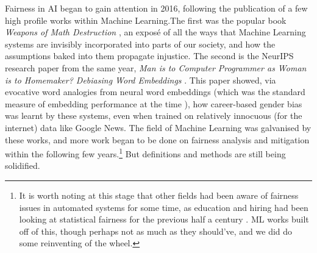 Fairness in AI began to gain attention in 2016, following the publication of a few high profile works within Machine Learning.The first was the popular book \textit{Weapons of Math Destruction} \citep{oneil2016weapons}, an exposé of all the ways that Machine Learning systems are invisibly incorporated into parts of our society, and how the assumptions baked into them propagate injustice. The second is the NeurIPS research paper from the same year, \textit{Man is to Computer Programmer as Woman is to Homemaker? Debiasing Word Embeddings} \citep{bolukbasi}. This paper showed, via evocative word analogies from neural word embeddings (which was the standard measure of embedding performance at the time \citep{mikolov-etal-2013-linguistic, wordsim, drozd-etal-2016-word}), how career-based gender bias was learnt by these systems, even when trained on relatively innocuous (for the internet) data like Google News. The field of Machine Learning was galvanised by these works, and more work began to be done on fairness analysis and mitigation within the following few years.\footnote{It is worth noting at this stage that other fields had been aware of fairness issues in automated systems for some time, as education and hiring had been looking at statistical fairness for the previous half a century \citep{hutchinson_mitchell_2019}. ML works built off of this, though perhaps not as much as they should've, and we did do some reinventing of the wheel.} But definitions and methods are still being solidified.


